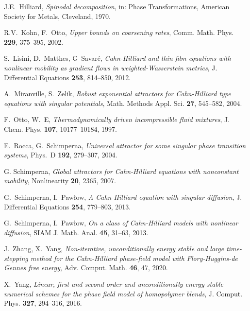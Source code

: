 \documentclass[11pt,  reqno]{amsart}%
\theoremstyle{plain}
\theoremstyle{definition}
\theoremstyle{remark}
\numberwithin{equation}{section}
\begin{document}
\begin{thebibliography}{}
J.E.~Hilliard, 
\textit{Spinodal decomposition}, 
in: Phase Transformations, American Society for Metals, Cleveland,
1970.

R.V.~Kohn, F.~Otto, 
\textit{Upper bounds on coarsening rates}, 
Comm. Math. Phys. \textbf{229}, 375--395, 2002.



   S.~Lisini, D.~Matthes, G~Savar{\'e}, 
    \textit{{C}ahn-{H}illiard and thin film equations with nonlinear mobility as gradient flows in weighted-{W}asserstein metrics},
    J. Differential Equations \textbf{253}, 814--850, 2012.

 A.~Miranville, S.~Zelik, 
    \textit{Robust exponential attractors for {C}ahn-{H}illiard type equations with singular potentials},
    Math. Methods Appl. Sci. \textbf{27}, 545--582, 2004.

F.~Otto, W.~E,
\textit{Thermodynamically driven incompressible fluid mixtures},
J. Chem. Phys. \textbf{107}, 10177--10184, 1997.

E.~Rocca, G.~Schimperna,
\textit{Universal attractor for some singular phase transition systems},
 Phys.\ D \textbf{192}, 279--307, 2004.

 G. Schimperna, 
 \textit{Global attractors for {C}ahn-{H}illiard equations with nonconstant mobility},
 Nonlinearity \textbf{20}, 2365, 2007.
    
G.~Schimperna, I.~Paw\l ow,
 \textit{A {C}ahn-{H}illiard equation with singular diffusion},
 J. Differential Equations \textbf{254}, 779--803, 2013.

G.~Schimperna, I.~Paw\l ow,
\textit{On a class of {C}ahn-{H}illiard models with nonlinear diffusion},
SIAM J. Math. Anal. \textbf{45}, 31--63, 2013.

J.~Zhang, X.~Yang, 
\textit{Non-iterative, unconditionally energy stable and large time-stepping method for the {C}ahn-{H}illiard phase-field model with {F}lory-{H}uggins-de {G}ennes free energy}, 
Adv. Comput. Math. \textbf{46}, 47, 2020.

X.~Yang, 
\textit{Linear, first and second order and unconditionally energy stable numerical schemes for the phase field model of homopolymer blends}, 
J. Comput. Phys. \textbf{327}, 294--316, 2016.


\end{thebibliography}
\end{document}
